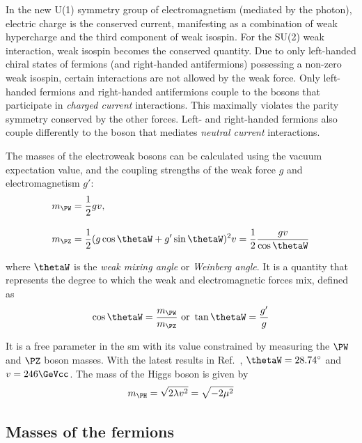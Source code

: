 In the new U(1) symmetry group of electromagnetism (mediated by the photon), electric charge is the conserved current, manifesting as a combination of weak hypercharge and the third component of weak isospin. For the SU(2) weak interaction, weak isospin becomes the conserved quantity. Due to only left-handed chiral states of fermions (and right-handed antifermions) possessing a non-zero weak isospin, certain interactions are not allowed by the weak force. Only left-handed fermions and right-handed antifermions couple to the \PW bosons that participate in \emph{charged current} interactions. This maximally violates the parity symmetry conserved by the other forces. Left- and right-handed fermions also couple differently to the \PZ boson that mediates \emph{neutral current} interactions.

The masses of the electroweak bosons can be calculated using the vacuum expectation value, and the coupling strengths of the weak force $g$ and electromagnetism $g'$:
\begin{equation}
    \begin{aligned}
m_{\PW} &= \frac{1}{2} gv, \\[1em]
m_{\PZ} &= \frac{1}{2} (g\cos\thetaW + g'\sin\thetaW)^2 v = \frac{1}{2}\frac{gv}{\cos\thetaW}
    \end{aligned}
    \label{eq:w_z_masses}
\end{equation}

where $\thetaW$ is the \emph{weak mixing angle} or \emph{Weinberg angle}. It is a quantity that represents the degree to which the weak and electromagnetic forces mix, defined as
\begin{equation}
    \cos\thetaW = \frac{m_{\PW}}{m_{\PZ}} \ \text{or} \ \tan\thetaW = \frac{g'}{g}
    \label{eq:weak_mixing_angle}
\end{equation}

It is a free parameter in the \acrlong{sm} with its value constrained by measuring the $\PW$ and $\PZ$ boson masses. With the latest results in Ref.~, $\thetaW = \text{28.74}^{\circ}$ and $v = \text{246}\GeVcc$. The mass of the Higgs boson is given by
\begin{equation}
    m_{\PH} = \sqrt{2\lambda v^2} = \sqrt{-2\mu^2}
    \label{eq:higgs_mass}
\end{equation}




\subsection{Masses of the fermions}
\label{subsec:theory_fermion_masses}

